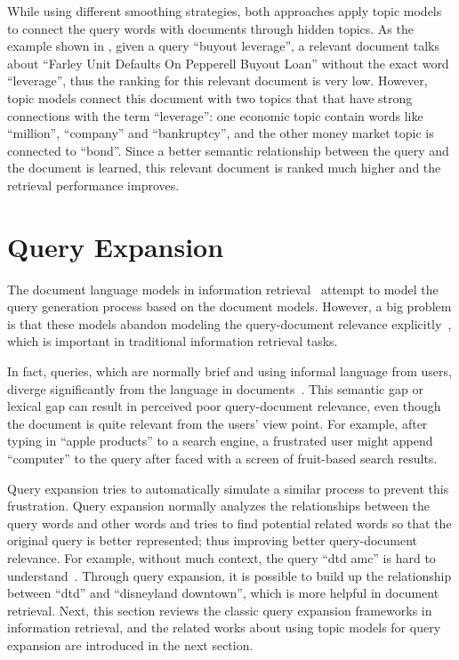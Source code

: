 While using different smoothing strategies, both approaches apply topic models to
connect the query words with documents through hidden topics. As the example shown in
\citet{wei-06}, given a query ``buyout leverage'', a relevant document talks about 
``Farley Unit Defaults On Pepperell Buyout Loan'' without the exact word ``leverage'',
thus the ranking for this relevant document is very low. However, topic models connect
this document with two topics that that have strong connections with the term ``leverage'': 
one economic topic contain words like ``million'', ``company'' and ``bankruptcy'',
and the other money market topic is connected to ``bond''.
Since a better semantic relationship between the query and the document is learned,
this relevant document is ranked much higher and the retrieval performance improves.


\section{Query Expansion}

The document language models in information
retrieval~\citep{PonteCroft} attempt to model the query
generation process based on the document models. However, a big
problem is that these models abandon modeling the query-document
relevance explicitly~\citep{Lavrenko-2001}, which is important in
traditional information retrieval tasks.

In fact, queries, which are normally brief and using informal
language from users, diverge significantly from the language in
documents~\citep{Muller-2009}. This semantic gap or lexical gap can
result in perceived poor query-document relevance, even though the document is
quite relevant from the users' view point. For example, after typing
in ``apple products'' to a search engine, a frustrated user might append
``computer'' to the query after faced with a screen of fruit-based
search results.

Query expansion tries to automatically simulate a similar process to
prevent this frustration. Query expansion normally analyzes the
relationships between the query words and other words and tries to
find potential related words so that the original query is better
represented; thus improving better query-document relevance. For
example, without much context, the query ``dtd amc'' is hard to understand~\citep{Jiang-2016}. Through query
expansion, it is possible to build up the relationship between ``dtd''
and ``disneyland downtown'', which is more helpful in document
retrieval.  Next, this section reviews the classic query expansion
frameworks in information retrieval, and the related works about using
topic models for query expansion are introduced in the next section.

